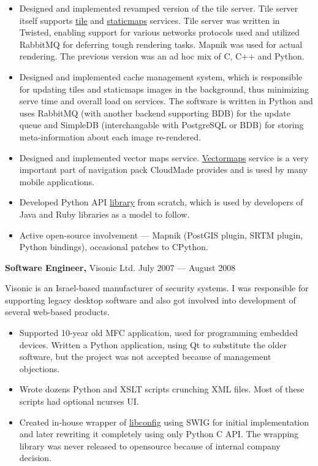 \documentclass[margin]{res}
\begin{document}
\begin{resume}
\begin{itemize} \itemsep -1pt
\item Designed and implemented revamped version of the tile
  server. Tile server itself supports
  \href{http://developers.cloudmade.com/projects/show/tiles}{tile} and
  \href{http://developers.cloudmade.com/projects/show/static-maps}{staticmaps}
  services. Tile server was written in Twisted, enabling support for
  various networks protocols used and utilized RabbitMQ for deferring
  tough rendering tasks. Mapnik was used for actual rendering.  The
  previous version was an ad hoc mix of C, C++ and Python.
\item Designed and implemented cache management system, which is
  responsible for updating tiles and staticmaps images in the
  background, thus minimizing serve time and overall load on
  services. The software is written in Python and uses RabbitMQ (with
  another backend supporting BDB) for the update queue and SimpleDB
  (interchangable with PostgreSQL or BDB) for storing meta-information
  about each image re-rendered.
\item Designed and implemented vector maps service.
  \href{http://developers.cloudmade.com/projects/show/vector-stream-server}{Vectormaps}
  service is a very important part of
  navigation pack CloudMade provides and is used by many
  mobile applications.
\item Developed Python API
  \href{http://developers.cloudmade.com/projects/show/python-lib}{library}
  from scratch,
  which is  used by developers of Java and Ruby
  libraries as a model to follow.
\item Active open-source involvement --- Mapnik
  (PostGIS plugin, SRTM plugin,
  Python bindings), occasional patches to CPython.
\end{itemize}

{\bf Software Engineer,} Visonic Ltd. \hfill July 2007 --- August 2008

Visonic is an Israel-based manufacturer of security systems.
I was responsible for supporting legacy desktop software and
also got involved into development of several web-based
products.\\

\begin{itemize} \itemsep -1pt
\item Supported 10-year old MFC application, used for programming
  embedded devices. Written a Python application, using Qt to
  substitute the older software, but the project was not accepted
  because of management objections.
\item Wrote dozens Python and XSLT scripts
  crunching XML files. Most of these scripts had optional ncurses UI.
\item Created in-house wrapper of
  \href{http://www.hyperrealm.com/libconfig/}{libconfig} using SWIG for initial
  implementation and later rewriting it completely using only Python C API.
  The wrapping library was never released to opensource because of
  internal company decision.
\end{itemize}




\end{resume}
\end{document}
